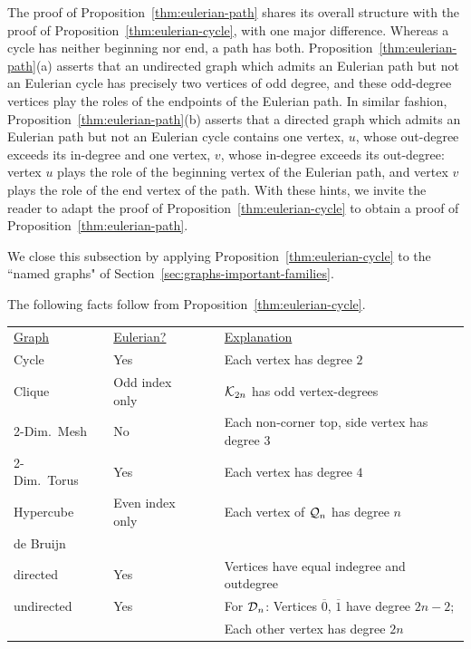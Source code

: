 The proof of Proposition~\ref{thm:eulerian-path} shares its overall structure with the proof of  Proposition~\ref{thm:eulerian-cycle}, with one major difference.  Whereas a cycle has neither beginning nor end, a path has both.  Proposition~\ref{thm:eulerian-path}(a) asserts that an undirected graph which admits an Eulerian path but not an Eulerian cycle has precisely two vertices of odd degree, and these odd-degree vertices play the roles of the endpoints of the Eulerian path.  In similar fashion, Proposition~\ref{thm:eulerian-path}(b) asserts that a directed graph which admits an Eulerian path but not an Eulerian cycle contains one vertex, $u$, whose out-degree exceeds its in-degree and one vertex, $v$, whose in-degree exceeds its out-degree: vertex $u$ plays the role of the beginning vertex of the Eulerian path, and vertex $v$ plays the role of the end vertex of the path.  With these hints, we invite the reader to adapt the proof of Proposition~\ref{thm:eulerian-cycle} to obtain a proof of Proposition~\ref{thm:eulerian-path}.

\bigskip

We close this subsection by applying Proposition~\ref{thm:eulerian-cycle} to the ``named graphs" of Section~\ref{sec:graphs-important-families}.

\medskip

\begin{corol}
\label{corol:eulerian-named-graphs}
The following facts follow from Proposition~\ref{thm:eulerian-cycle}.

\medskip

\noindent
\begin{tabular}{lclcl}
\underline{Graph} & & \underline{Eulerian?} & & \underline{Explanation} \\ 
Cycle               & & Yes                     & & Each vertex has degree $2$ \\
Clique              & & Odd index only   & & $\mbox{$\cal K$}_{2n}$ has odd vertex-degrees \\
2-Dim.~Mesh   & & No                      & & Each non-corner top, side vertex has degree $3$ \\                      
2-Dim.~Torus   & & Yes                     & & Each vertex has degree $4$ \\
Hypercube       & & Even index only & & Each vertex of $\mbox{$\cal Q$}_n$ has degree $n$ \\
de Bruijn           & &                           & &  \\
\hspace*{.15in}directed  & & Yes  & & Vertices have equal {\sc indegree} and {\sc outdegree} \\
\hspace*{.15in}undirected
         & &  Yes & & For $\mbox{$\cal D$}_n$: Vertices $\overline{0}$, $\overline{1}$ have
                                                  degree $2n-2$; \\
         & &         & & \hspace*{.5in}Each other vertex has degree $2n$
\end{tabular}
\end{corol}

